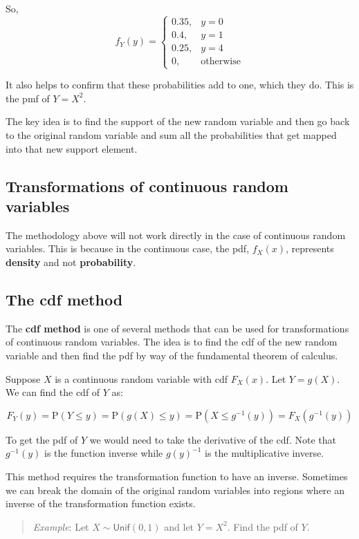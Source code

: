 \documentclass[
  letterpaper,
  DIV=11,
  numbers=noendperiod]{scrreprt}
\begin{document}
So, \[
f_Y(y)=\left\{\begin{array}{ll} 0.35, & y=0 \\ 
0.4, & y=1 \\
0.25, & y=4 \\
0, & \mbox{otherwise} \end{array}\right.
\]

It also helps to confirm that these probabilities add to one, which they
do. This is the pmf of \(Y=X^2\).

The key idea is to find the support of the new random variable and then
go back to the original random variable and sum all the probabilities
that get mapped into that new support element.

\subsection{Transformations of continuous random
variables}\label{transformations-of-continuous-random-variables}

The methodology above will not work directly in the case of continuous
random variables. This is because in the continuous case, the pdf,
\(f_X(x)\), represents \textbf{density} and not \textbf{probability}.

\subsection{The cdf method}\label{the-cdf-method}

The \textbf{cdf method} is one of several methods that can be used for
transformations of continuous random variables. The idea is to find the
cdf of the new random variable and then find the pdf by way of the
fundamental theorem of calculus.

Suppose \(X\) is a continuous random variable with cdf \(F_X(x)\). Let
\(Y=g(X)\). We can find the cdf of \(Y\) as:

\[
F_Y(y)=\mbox{P}(Y\leq y)=\mbox{P}(g(X)\leq y)=\mbox{P}(X\leq g^{-1}(y))=F_X(g^{-1}(y))
\]

To get the pdf of \(Y\) we would need to take the derivative of the cdf.
Note that \(g^{-1}(y)\) is the function inverse while \(g(y)^{-1}\) is
the multiplicative inverse.

This method requires the transformation function to have an inverse.
Sometimes we can break the domain of the original random variables into
regions where an inverse of the transformation function exists.

\begin{quote}
\emph{Example}: Let \(X\sim \textsf{Unif}(0,1)\) and let \(Y=X^2\). Find
the pdf of \(Y\).
\end{quote}
\end{document}
